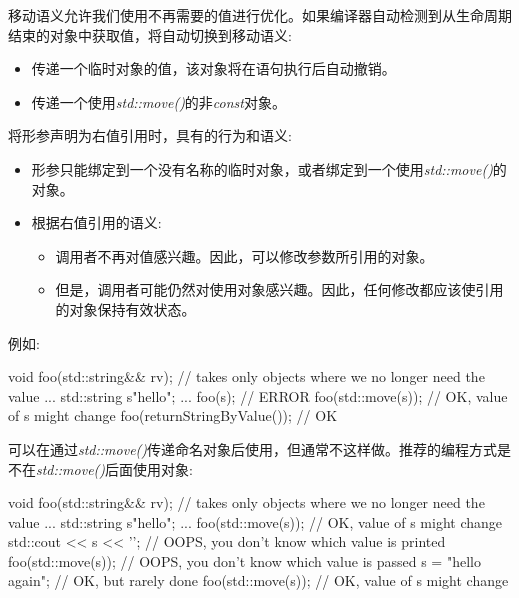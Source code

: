 移动语义允许我们使用不再需要的值进行优化。如果编译器自动检测到从生命周期结束的对象中获取值，将自动切换到移动语义:\par

\begin{itemize}
  \item 传递一个临时对象的值，该对象将在语句执行后自动撤销。
  \item 传递一个使用\textit{std::move()}的非\textit{const}对象。
\end{itemize}


将形参声明为右值引用时，具有的行为和语义:\par

\begin{itemize}
  \item 形参只能绑定到一个没有名称的临时对象，或者绑定到一个使用\textit{std::move()}的对象。
  \item 根据右值引用的语义:
  \begin{itemize}
    \item[-] 调用者不再对值感兴趣。因此，可以修改参数所引用的对象。
    \item[-] 但是，调用者可能仍然对使用对象感兴趣。因此，任何修改都应该使引用的对象保持有效状态。
  \end{itemize}
\end{itemize}

例如:\par

\begin{codebox}[cpp]
void foo(std::string&& rv); // takes only objects where we no longer need the value
...
std::string s{"hello"};
...
foo(s); // ERROR
foo(std::move(s)); // OK, value of s might change
foo(returnStringByValue()); // OK
\end{codebox}

可以在通过\textit{std::move()}传递命名对象后使用，但通常不这样做。推荐的编程方式是不在\textit{std::move()}后面使用对象:\par

\begin{codebox}[cpp]
void foo(std::string&& rv); // takes only objects where we no longer need the value
...
std::string s{"hello"};
...
foo(std::move(s)); // OK, value of s might change
std::cout << s << '\n'; // OOPS, you don’t know which value is printed
foo(std::move(s)); // OOPS, you don’t know which value is passed
s = "hello again"; // OK, but rarely done
foo(std::move(s)); // OK, value of s might change
\end{codebox}

